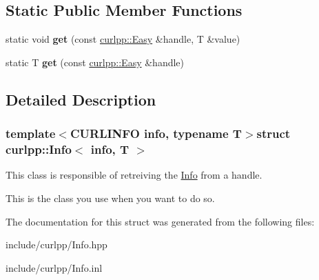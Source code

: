 \subsection*{Static Public Member Functions}
\begin{DoxyCompactItemize}
\item 
\hypertarget{structcurlpp_1_1Info_a9345c1cf3fb050740b08a0e0ced3f45f}{static void {\bfseries get} (const \hyperlink{classcurlpp_1_1Easy}{curlpp\-::\-Easy} \&handle, T \&value)}\label{structcurlpp_1_1Info_a9345c1cf3fb050740b08a0e0ced3f45f}

\item 
\hypertarget{structcurlpp_1_1Info_a1286f3526454510655096c4c62331706}{static T {\bfseries get} (const \hyperlink{classcurlpp_1_1Easy}{curlpp\-::\-Easy} \&handle)}\label{structcurlpp_1_1Info_a1286f3526454510655096c4c62331706}

\end{DoxyCompactItemize}


\subsection{Detailed Description}
\subsubsection*{template$<$C\-U\-R\-L\-I\-N\-F\-O info, typename T$>$struct curlpp\-::\-Info$<$ info, T $>$}

This class is responsible of retreiving the \hyperlink{structcurlpp_1_1Info}{Info} from a handle. 

This is the class you use when you want to do so. 

The documentation for this struct was generated from the following files\-:\begin{DoxyCompactItemize}
\item 
include/curlpp/Info.\-hpp\item 
include/curlpp/Info.\-inl\end{DoxyCompactItemize}
